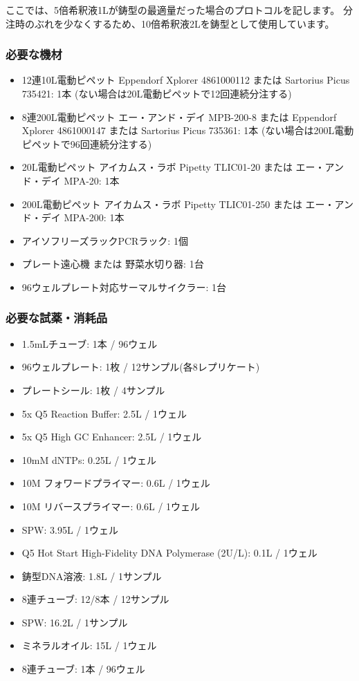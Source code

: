 \documentclass[titlepage,10pt,a4paper,uplatex]{jsbook}
\begin{document}
ここでは、5倍希釈液1{\textmu}Lが鋳型の最適量だった場合のプロトコルを記します。
分注時のぶれを少なくするため、10倍希釈液2{\textmu}Lを鋳型として使用しています。

\subsubsection{必要な機材}
\begin{itemize}
\item 12連10{\textmu}L電動ピペット Eppendorf Xplorer 4861000112 または Sartorius Picus 735421: 1本 (ない場合は20{\textmu}L電動ピペットで12回連続分注する)
\item 8連200{\textmu}L電動ピペット エー・アンド・デイ MPB-200-8 または Eppendorf Xplorer 4861000147 または Sartorius Picus 735361: 1本 (ない場合は200{\textmu}L電動ピペットで96回連続分注する)
\item 20{\textmu}L電動ピペット アイカムス・ラボ Pipetty TLIC01-20 または エー・アンド・デイ MPA-20: 1本
\item 200{\textmu}L電動ピペット アイカムス・ラボ Pipetty TLIC01-250 または エー・アンド・デイ MPA-200: 1本
\item アイソフリーズラックPCRラック: 1個
\item プレート遠心機 または 野菜水切り器: 1台
\item 96ウェルプレート対応サーマルサイクラー: 1台
\end{itemize}

\subsubsection{必要な試薬・消耗品}
\begin{itemize}
\item 1.5mLチューブ: 1本 / 96ウェル
\item 96ウェルプレート: 1枚 / 12サンプル(各8レプリケート)
\item プレートシール: 1枚 / 4サンプル
\item 5x Q5 Reaction Buffer: 2.5{\textmu}L / 1ウェル
\item 5x Q5 High GC Enhancer: 2.5{\textmu}L / 1ウェル
\item 10mM dNTPs: 0.25{\textmu}L / 1ウェル
\item 10{\textmu}M フォワードプライマー: 0.6{\textmu}L / 1ウェル
\item 10{\textmu}M リバースプライマー: 0.6{\textmu}L / 1ウェル
\item SPW: 3.95{\textmu}L / 1ウェル
\item Q5 Hot Start High-Fidelity DNA Polymerase (2U/{\textmu}L): 0.1{\textmu}L / 1ウェル
\item 鋳型DNA溶液: 1.8{\textmu}L / 1サンプル
\item 8連チューブ: 12/8本 / 12サンプル
\item SPW: 16.2{\textmu}L / 1サンプル
\item ミネラルオイル: 15{\textmu}L / 1ウェル
\item 8連チューブ: 1本 / 96ウェル
\end{itemize}
\end{document}
